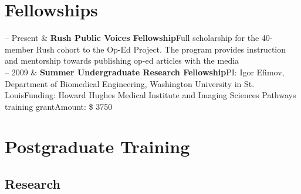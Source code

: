 \documentclass[10pt, letterpaper]{article}
\newcommand{\WASHU}{Washington University in St. Louis}
\newcommand{\Duration}[2]{\fontsize{9pt}{0}\selectfont #1 -- #2}
\newcommand{\Ongoing}{Present} %
\newcommand{\Appointment}[4]{\textbf{#1}\newline  #2\newline  #3\newline  #4}
\newcommand{\Twoline}[2]{\textbf{#1}\newline  #2}
\begin{document}
\section{Fellowships}

\begin{EntriesTable}
  \Duration{2021}{\Ongoing} &
  \Twoline{Rush Public Voices Fellowship}
  {Full scholarship for the 40-member Rush cohort to the Op-Ed Project. \newline The program provides instruction and mentorship towards publishing op-ed articles with the media}
  \\

  \Duration{2009}{2009}  &
  \Appointment{Summer Undergraduate Research Fellowship}
  {PI: Igor Efimov, Department of Biomedical Engineering, {\WASHU}}
  {Funding: Howard Hughes Medical Institute and Imaging Sciences Pathways training grant}
  {Amount: \$ 3750}
\end{EntriesTable}


\section{Postgraduate Training}
\subsection{Research}
\end{document}
